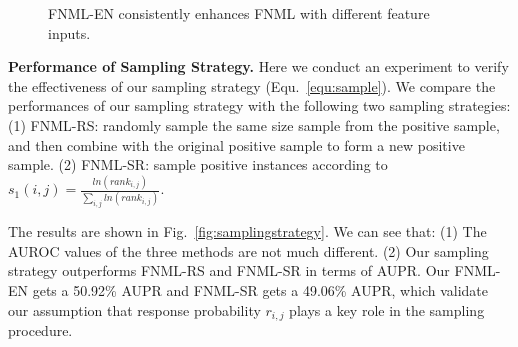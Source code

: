 \documentclass[conference]{IEEEtran}
\begin{document}
\begin{figure}[!ht]
\centering
{}

\vspace*{-10pt}
\caption{FNML-EN consistently enhances FNML with different feature inputs.}\label{fig:stability-EN}
\end{figure}

\textbf{Performance of Sampling Strategy.} 
Here we conduct an experiment to verify the effectiveness of our sampling strategy (Equ.~\ref{equ:sample}).  We compare the performances of our sampling strategy with the following two sampling strategies: (1) FNML-RS: randomly sample the same size sample from the positive sample, and then combine with the original positive sample to form a new positive sample.  (2) FNML-SR: sample positive instances according to $
s_{1}(i,j) = \frac{ln(rank_{i,j})}{\sum_{i,j}{ln(rank_{i,j})}}$. 

The results are shown in Fig.~\ref{fig:samplingstrategy}. We can see that: (1) The AUROC values of the three methods are not much different. (2) Our sampling strategy outperforms FNML-RS and FNML-SR in terms of AUPR. Our FNML-EN gets a 50.92\% AUPR and FNML-SR gets a 49.06\% AUPR, which validate our assumption that response probability $r_{i,j}$ plays a key role in the sampling procedure.
\end{document}
